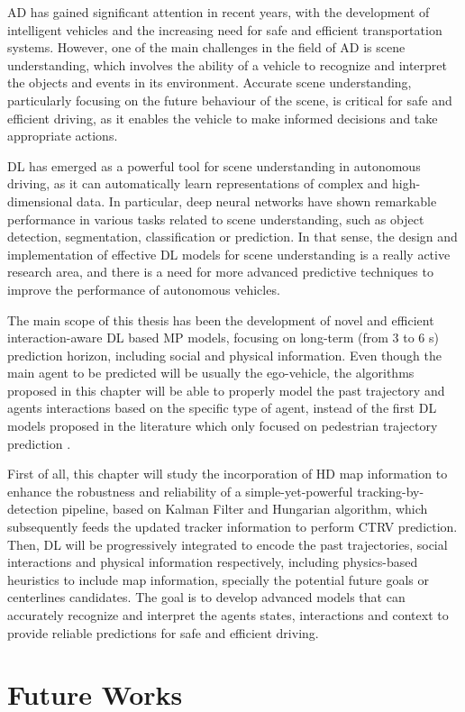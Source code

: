 \ac{AD} has gained significant attention in recent years, with the development of intelligent vehicles and the increasing need for safe and efficient transportation systems. However, one of the main challenges in the field of \ac{AD} is scene understanding, which involves the ability of a vehicle to recognize and interpret the objects and events in its environment. Accurate scene understanding, particularly focusing on the future behaviour of the scene, is critical for safe and efficient driving, as it enables the vehicle to make informed decisions and take appropriate actions.

\ac{DL} has emerged as a powerful tool for scene understanding in autonomous driving, as it can automatically learn representations of complex and high-dimensional data. In particular, deep neural networks have shown remarkable performance in various tasks related to scene understanding, such as object detection, segmentation, classification or prediction. In that sense, the design and implementation of effective \ac{DL} models for scene understanding is a really active research area, and there is a need for more advanced predictive techniques to improve the performance of autonomous vehicles.

The main scope of this thesis has been the development of novel and efficient interaction-aware \ac{DL} based \ac{MP} models, focusing on long-term (from 3 to 6 s) prediction horizon, including social and physical information. Even though the main agent to be predicted will be usually the ego-vehicle, the algorithms proposed in this chapter will be able to properly model the past trajectory and agents interactions based on the specific type of agent, instead of the first \ac{DL} models proposed in the literature which only focused on pedestrian trajectory prediction \cite{alahi2016social, gupta2018social, sadeghian2019sophie}. 

First of all, this chapter will study the incorporation of HD map information to enhance the robustness and reliability of a simple-yet-powerful tracking-by-detection pipeline, based on Kalman Filter and Hungarian algorithm, which subsequently feeds the updated tracker information to perform \ac{CTRV} prediction. Then, \ac{DL} will be progressively integrated to encode the past trajectories, social interactions and physical information respectively, including physics-based heuristics to include map information, specially the potential future goals or centerlines candidates. The goal is to develop advanced models that can accurately recognize and interpret the agents states, interactions and context to provide reliable predictions for safe and efficient driving. 

\section{Future Works}
\label{sec:9_future_works}

